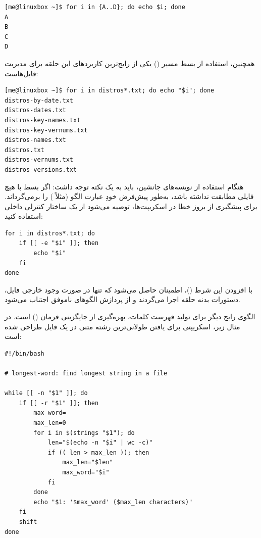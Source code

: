 \begin{latin}
\begin{lstlisting}
[me@linuxbox ~]$ for i in {A..D}; do echo $i; done
A
B
C
D
\end{lstlisting}
\end{latin}

همچنین، استفاده از بسط مسیر () یکی از رایج‌ترین کاربردهای این حلقه برای مدیریت فایل‌هاست:

\begin{latin}
\begin{lstlisting}
[me@linuxbox ~]$ for i in distros*.txt; do echo "$i"; done
distros-by-date.txt
distros-dates.txt
distros-key-names.txt
distros-key-vernums.txt
distros-names.txt
distros.txt
distros-vernums.txt
distros-versions.txt
\end{lstlisting}
\end{latin}

هنگام استفاده از نویسه‌های جانشین، باید به یک نکته توجه داشت: اگر بسط با هیچ فایلی مطابقت نداشته باشد،  به‌طور پیش‌فرض خودِ عبارت الگو (مثلاً ) را برمی‌گرداند. برای پیشگیری از بروز خطا در اسکریپت‌ها، توصیه می‌شود از یک ساختار کنترلی داخلی استفاده کنید:

\begin{latin}
\begin{lstlisting}
for i in distros*.txt; do
    if [[ -e "$i" ]]; then
        echo "$i"
    fi
done
\end{lstlisting}
\end{latin}

با افزودن این شرط ()، اطمینان حاصل می‌شود که تنها در صورت وجود خارجی فایل، دستورات بدنه حلقه اجرا می‌گردند و از پردازش الگوهای ناموفق اجتناب می‌شود.

الگوی رایج دیگر برای تولید فهرست کلمات، بهره‌گیری از جایگزینی فرمان () است. در مثال زیر، اسکریپتی برای یافتن طولانی‌ترین رشته متنی در یک فایل طراحی شده است:

\begin{latin}
\begin{lstlisting}
#!/bin/bash

# longest-word: find longest string in a file

while [[ -n "$1" ]]; do
    if [[ -r "$1" ]]; then
        max_word=
        max_len=0
        for i in $(strings "$1"); do
            len="$(echo -n "$i" | wc -c)"
            if (( len > max_len )); then
                max_len="$len"
                max_word="$i"
            fi
        done
        echo "$1: '$max_word' ($max_len characters)"
    fi
    shift
done
\end{lstlisting}
\end{latin}

